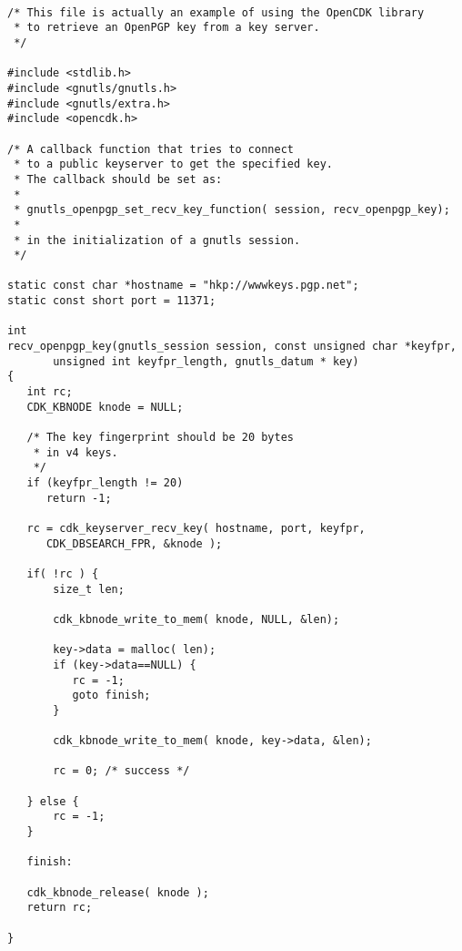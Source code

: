 \begin {verbatim}

/* This file is actually an example of using the OpenCDK library
 * to retrieve an OpenPGP key from a key server.
 */

#include <stdlib.h>
#include <gnutls/gnutls.h>
#include <gnutls/extra.h>
#include <opencdk.h>

/* A callback function that tries to connect
 * to a public keyserver to get the specified key.
 * The callback should be set as:
 *
 * gnutls_openpgp_set_recv_key_function( session, recv_openpgp_key);
 *
 * in the initialization of a gnutls session.
 */

static const char *hostname = "hkp://wwwkeys.pgp.net";
static const short port = 11371;

int
recv_openpgp_key(gnutls_session session, const unsigned char *keyfpr, 
       unsigned int keyfpr_length, gnutls_datum * key)
{
   int rc;
   CDK_KBNODE knode = NULL;

   /* The key fingerprint should be 20 bytes
    * in v4 keys.
    */
   if (keyfpr_length != 20)
      return -1;

   rc = cdk_keyserver_recv_key( hostname, port, keyfpr, 
      CDK_DBSEARCH_FPR, &knode );

   if( !rc ) {
       size_t len;

       cdk_kbnode_write_to_mem( knode, NULL, &len);

       key->data = malloc( len);
       if (key->data==NULL) {
          rc = -1;
          goto finish;
       }

       cdk_kbnode_write_to_mem( knode, key->data, &len);

       rc = 0; /* success */

   } else {
       rc = -1;
   }

   finish:

   cdk_kbnode_release( knode );
   return rc;

}


\end{verbatim}
